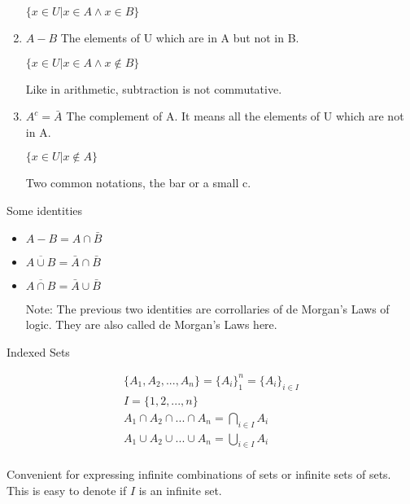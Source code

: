 \documentclass{report}
\begin{document}
\begin{description}
\begin{enumerate}
                $\{x \in U | x \in A \land x \in B \}$

            \item $A - B$ The elements of U which are in
                A but not in B.

                $\{x \in U | x \in A \land x \notin B \}$

                Like in arithmetic, subtraction is not
                commutative.
            \item $A^{c} = \bar{A}$ The complement of A. It means
                all the elements of U which are not in A.

                $\{ x \in U | x \notin A \}$

                Two common notations, the bar or a small c.
        \end{enumerate}

        Some identities
        \begin{itemize}
            \item $A - B = A \cap \bar{B}$
            \item $\overline{A \cup B} = \bar{A} \cap \bar{B}$
            \item $\overline{A \cap B} = \bar{A} \cup \bar{B}$
                \begin{mdframed}
                    Note: The previous two identities are
                    corrollaries of de Morgan's Laws of logic.
                    They are also called de Morgan's Laws here.
                \end{mdframed}
        \end{itemize}

    \item {\large Indexed Sets }

        \begin{gather}
            \{A_1, A_2, ... , A_n\} = \{ A_i \}_{1}^{n}
            = \{ A_i \}_{i \in I}\\
            I = \{1, 2, ..., n \} \\
            A_1 \cap A_2 \cap ... \cap A_n = \bigcap_{i \in I} A_i\\
            A_1 \cup A_2 \cup ... \cup A_n = \bigcup_{i \in I} A_i\\
        \end{gather}

        Convenient for expressing infinite combinations of sets
        or infinite sets of sets. This is easy to denote if
        $I$ is an infinite set.


\end{description}
\end{document}
